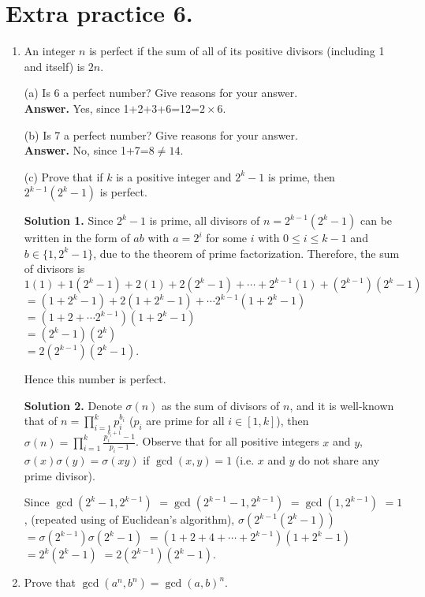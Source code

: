 \documentclass[11pt]{article}
\begin{document}
\section {Extra practice 6.}
\begin{enumerate}
\item An integer $n$ is perfect if the sum of all of its positive divisors (including 1 and itself) is $2n$.

(a) Is 6 a perfect number? Give reasons for your answer.\\
\textbf{Answer.} Yes, since 1+2+3+6=12=$2\times 6$.

(b) Is 7 a perfect number? Give reasons for your answer.\\
\textbf{Answer.} No, since 1+7=8$\neq 14$.

(c) Prove that if $k$ is a positive integer and $2^k-1$ is prime, then $2^{k-1}(2^k-1)$ is perfect.

\textbf {Solution 1.} Since $2^k-1$ is prime, all divisors of $n=2^{k-1}(2^k-1)$ can be written in the form of $ab$ with $a=2^i$ for some $i$ with $0\le i\le k-1$ and $b\in\{1, 2^k-1\}$, due to the theorem of prime factorization. Therefore, the sum of divisors is\\ $1(1)+1(2^k-1)+2(1)+2(2^k-1)+\cdots + 2^{k-1}(1)+(2^{k-1})(2^k-1)$\\
$=(1+2^k-1)+2(1+2^k-1)+\cdots 2^{k-1}(1+2^k-1)$\\
$=(1+2+\cdots 2^{k-1})(1+2^k-1)$\\
$=(2^k-1)(2^k)$\\
$=2(2^{k-1})(2^k-1)$.

Hence this number is perfect.

\textbf {Solution 2.} Denote $\sigma (n)$ as the sum of divisors of $n$, and it is well-known that of $n=\displaystyle\prod_{i=1}^{k} p_i^{b_i}$ ($p_i$ are prime for all $i\in [1,k]$), then $\sigma (n)=\displaystyle\prod_{i=1}^{k} \frac{p_i^{b_i+1}-1}{p_i-1}$. Observe that for all positive integers $x$ and $y$, $\sigma (x)\sigma (y)=\sigma (xy)$ if $\gcd (x,y)=1$ (i.e. $x$ and $y$ do not share any prime divisor).

Since $\gcd (2^k-1, 2^{k-1})$
$=\gcd (2^{k-1}-1, 2^{k-1})$
$=\gcd (1, 2^{k-1})$
$=1$, (repeated using of Euclidean's algorithm),
$\sigma (2^{k-1}(2^k-1))$
$=\sigma(2^{k-1})\sigma(2^k-1)$
$=(1+2+4+\cdots + 2^{k-1})(1+2^k-1)$
$=2^k(2^k-1)$
$=2(2^{k-1})(2^k-1)$.

\item Prove that $\gcd (a^n,b^n)=\gcd (a,b)^n$.


\end{enumerate}
\end{document}
